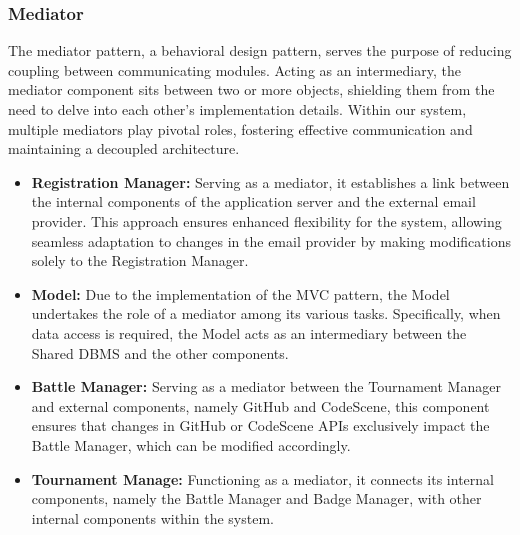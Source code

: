 \documentclass{article}
\begin{document}
\subsubsection{Mediator}
The mediator pattern, a behavioral design pattern, serves the purpose of reducing coupling between communicating modules. Acting as an intermediary, the mediator component sits between two or more objects, shielding them from the need to delve into each other's implementation details. Within our system, multiple mediators play pivotal roles, fostering effective communication and maintaining a decoupled architecture.
\begin{itemize}
    \item \textbf{Registration Manager:} Serving as a mediator, it establishes a link between the internal components of the application server and the external email provider. This approach ensures enhanced flexibility for the system, allowing seamless adaptation to changes in the email provider by making modifications solely to the Registration Manager.
    \item \textbf{Model:} Due to the implementation of the MVC pattern, the Model undertakes the role of a mediator among its various tasks. Specifically, when data access is required, the Model acts as an intermediary between the Shared DBMS and the other components.
    \item \textbf{Battle Manager:} Serving as a mediator between the Tournament Manager and external components, namely GitHub and CodeScene, this component ensures that changes in GitHub or CodeScene APIs exclusively impact the Battle Manager, which can be modified accordingly.
    \item \textbf{Tournament Manage:} Functioning as a mediator, it connects its internal components, namely the Battle Manager and Badge Manager, with other internal components within the system.
\end{itemize}
\end{document}
